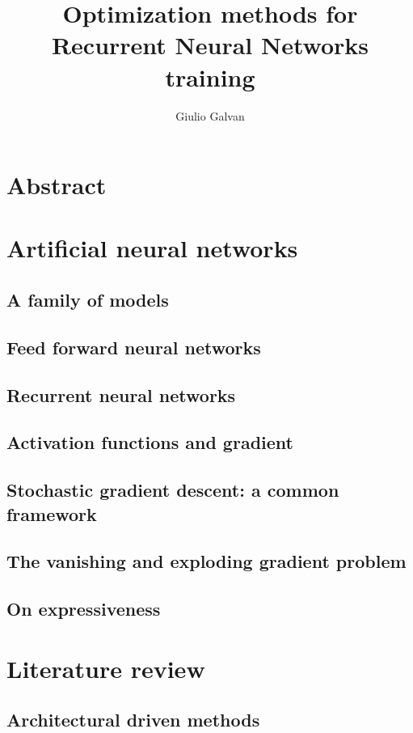 \documentclass[english,laurea,twoside,10pt]{UFtesi}
\title{Optimization methods for Recurrent Neural Networks training}
\author{Giulio Galvan}
\date{}
\theoremstyle{definition}
\theoremstyle{definition}
\theoremstyle{definition}
\begin{document}
\maketitle
\frontmatter
\setcounter{page}{0}
\chapter*{Abstract}
	
\tableofcontents
\mainmatter
\chapter{Artificial neural networks}
  \section{A family of models}
  
  \section{Feed forward neural networks}
  
  \section{Recurrent neural networks}
  \label{sec:rnn_intro}
  
  \section{Activation functions and gradient}
  
  \section{Stochastic gradient descent: a common framework}
  
  \section{The vanishing and exploding gradient problem}
    \label{sec:vanishing}
    
  \section{On expressiveness}
  \label{sec:expressiveness}
  
\chapter{Literature review}
  
  \section{Architectural driven methods}
  
  
  
  
\end{document}
